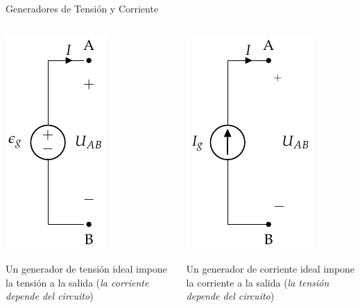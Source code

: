 \documentclass[xcolor={usenames,svgnames,dvipsnames}]{beamer}
\begin{document}
\begin{frame}[label={sec:orgcae5a87}]{Generadores de Tensión y Corriente}
\begin{columns}
\begin{column}{0.5\columnwidth}
\begin{center}
\includegraphics[height=0.6\textheight]{figs/FuenteTensionIdealDC.pdf}
\end{center}
Un \alert{generador de tensión ideal} impone la tensión a la salida (\emph{la corriente depende del circuito})
\end{column}

\begin{column}{0.5\columnwidth}
\begin{center}
\includegraphics[height=0.6\textheight]{figs/FuenteCorrienteIdeal.pdf}
\end{center}
Un \alert{generador de corriente ideal} impone la corriente a la salida (\emph{la tensión depende del circuito})
\end{column}
\end{columns}
\end{frame}
\end{document}
